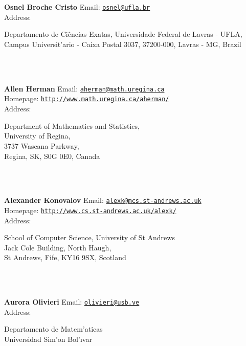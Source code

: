 \documentclass[a4paper,11pt]{report}
\begin{document}
\begin{titlepage}
\mbox{}\\
{\mbox{}\\
\small \noindent \textbf{Osnel Broche Cristo   }  Email: \href{mailto://osnel@ufla.br} {\texttt{osnel@ufla.br}}\\
  Address: \begin{minipage}[t]{8cm}\noindent
 Departamento de Ci{\^e}ncias Exatas, Universidade Federal de Lavras - UFLA,
Campus Universit{\a'a}rio - Caixa Postal 3037, 37200-000, Lavras - MG, Brazil \end{minipage}
}\\
{\mbox{}\\
\small \noindent \textbf{Allen Herman    }  Email: \href{mailto://aherman@math.uregina.ca} {\texttt{aherman@math.uregina.ca}}\\
  Homepage: \href{http://www.math.uregina.ca/~aherman/} {\texttt{http://www.math.uregina.ca/\texttt{}aherman/}}\\
  Address: \begin{minipage}[t]{8cm}\noindent
 Department of Mathematics and Statistics, \\
 University of Regina, \\
 3737 Wascana Parkway, \\
 Regina, SK, S0G 0E0, Canada \end{minipage}
}\\
{\mbox{}\\
\small \noindent \textbf{Alexander Konovalov    }  Email: \href{mailto://alexk@mcs.st-andrews.ac.uk} {\texttt{alexk@mcs.st-andrews.ac.uk}}\\
  Homepage: \href{http://www.cs.st-andrews.ac.uk/~alexk/} {\texttt{http://www.cs.st-andrews.ac.uk/\texttt{}alexk/}}\\
  Address: \begin{minipage}[t]{8cm}\noindent
 School of Computer Science, University of St Andrews\\
 Jack Cole Building, North Haugh,\\
 St Andrews, Fife, KY16 9SX, Scotland \end{minipage}
}\\
{\mbox{}\\
\small \noindent \textbf{Aurora Olivieri   }  Email: \href{mailto://olivieri@usb.ve} {\texttt{olivieri@usb.ve}}\\
  Address: \begin{minipage}[t]{8cm}\noindent
 Departamento de Matem{\a'a}ticas\\
 Universidad Sim{\a'o}n Bol{\a'\i}var\\

\end{minipage}}
\end{titlepage}
\end{document}

